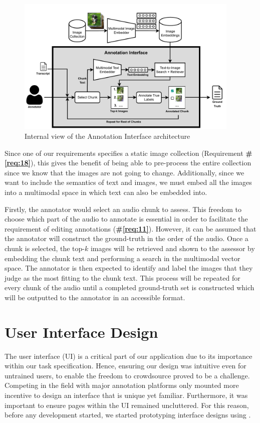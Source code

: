 \documentclass{l4proj}
\begin{document}
\begin{figure}[h]
    \centering
    \includegraphics[width=0.95\textwidth]{figures/annotation_interface.pdf}
    \caption{Internal view of the Annotation Interface architecture}
    \label{fig:annotation_interface}
\end{figure}

Since one of our requirements specifies a static image collection (Requirement \textbf{\#\ref{req:18}}), this gives the benefit of being able to pre-process the entire collection since we know that the images are not going to change. Additionally, since we want to include the semantics of text and images, we must embed all the images into a multimodal space in which text can also be embedded into.

Firstly, the annotator would select an audio chunk to assess. This freedom to choose which part of the audio to annotate is essential in order to facilitate the requirement of editing annotations (\textbf{\#\ref{req:11}}). However, it can be assumed that the annotator will construct the ground-truth in the order of the audio. Once a chunk is selected, the top-$k$ images will be retrieved and shown to the assessor by embedding the chunk text and performing a search in the multimodal vector space. The annotator is then expected to identify and label the images that they judge as the most fitting to the chunk text. This process will be repeated for every chunk of the audio until a completed ground-truth set is constructed which will be outputted to the annotator in an accessible format.


\section{User Interface Design}
The user interface (UI) is a critical part of our application due to its importance within our task specification. Hence, ensuring our design was intuitive even for untrained users, to enable the freedom to crowdsource proved to be a challenge. Competing in the field with major annotation platforms only mounted more incentive to design an interface that is unique yet familiar. Furthermore, it was important to ensure pages within the UI remained uncluttered. For this reason, before any development started, we started prototyping interface designs using \cite{figma}.
\end{document}
